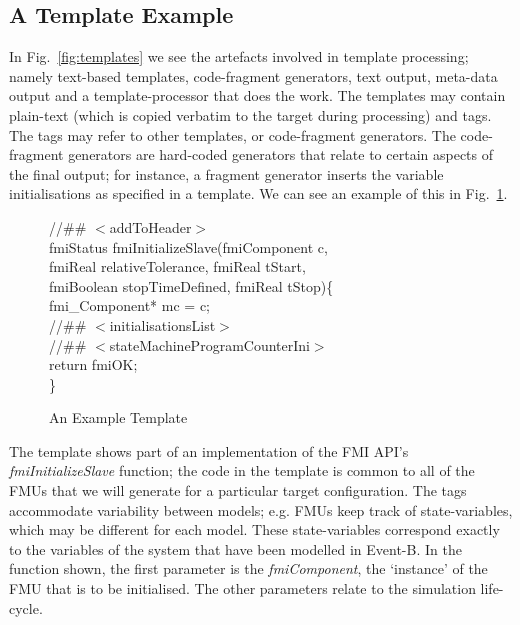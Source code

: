 \documentclass{llncs}%
\begin{document}
\subsection{A Template Example}
In Fig.~\ref{fig:templates} we see the artefacts involved in template processing; namely text-based templates, code-fragment generators, text output, meta-data output and a template-processor that does the work. The templates may contain plain-text (which is copied verbatim to the target during processing) and tags. The tags may refer to other templates, or code-fragment generators. The code-fragment generators are hard-coded generators that relate to certain aspects of the final output; for instance, a fragment generator inserts the variable initialisations as specified in a template. We can see an example of this in Fig.~\ref{fig:templateExample}. 
%
\begin{figure}[t]
\begin{center}
\begin{minipage}{0.6\textwidth}
//\#\# $<$addToHeader$>$\\
fmiStatus fmiInitializeSlave(fmiComponent c,\\
\hspace*{0.2cm}fmiReal relativeTolerance, fmiReal tStart,\\
\hspace*{0.2cm}fmiBoolean stopTimeDefined, fmiReal tStop)\{\\
\hspace*{0.4cm}fmi\_Component* mc = c;\\
\hspace*{0.4cm}//\#\# $<$initialisationsList$>$\\
\hspace*{0.4cm}//\#\# $<$stateMachineProgramCounterIni$>$\\
\hspace*{0.4cm}return fmiOK;\\
\}
\caption{An Example Template}
\end{minipage}
\end{center}
\label{fig:templateExample}
\end{figure}
%
%
The template shows part of an implementation of the FMI API's \emph{fmiInitializeSlave} function; the code in the template is common to all of the FMUs that we will generate for a particular target configuration. The tags accommodate variability between models; e.g. FMUs keep track of state-variables, which may be different for each model. These state-variables correspond exactly to the variables of the system that have been modelled in Event-B. In the function shown, the first parameter is the \emph{fmiComponent}, the `instance' of the FMU that is to be initialised. The other parameters relate to the simulation life-cycle.  
\end{document}
